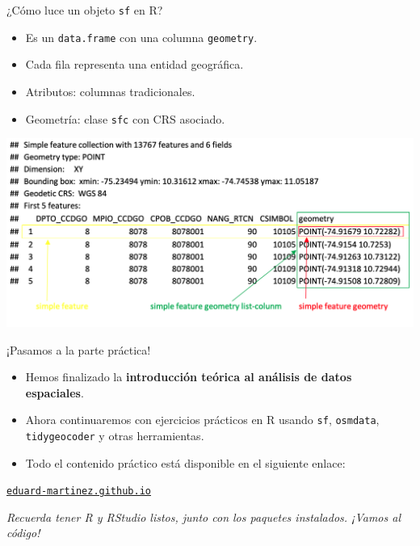 \documentclass{beamer}
\begin{document}
\begin{frame}{¿Cómo luce un objeto \texttt{sf} en R?}
\begin{itemize}
    \item Es un \texttt{data.frame} con una columna \texttt{geometry}.
    \item Cada fila representa una entidad geográfica.
    \item Atributos: columnas tradicionales.
    \item Geometría: clase \texttt{sfc} con CRS asociado.
\end{itemize}
\centering
\includegraphics[width=0.95\linewidth]{figures/sf_console.png}
\end{frame}

\begin{frame}{¡Pasamos a la parte práctica!}
\vspace{1em}
\begin{itemize}
    \item Hemos finalizado la \textbf{introducción teórica al análisis de datos espaciales}.
    \item Ahora continuaremos con ejercicios prácticos en R usando \texttt{sf}, \texttt{osmdata}, \texttt{tidygeocoder} y otras herramientas.
    \item Todo el contenido práctico está disponible en el siguiente enlace:
\end{itemize}
\vspace{1.5em}
\begin{center}
\Large
\href{https://eduard-martinez.github.io/workshop/gis_in_r/lecture/parte-2.html}{\texttt{eduard-martinez.github.io}}
\end{center}
\vspace{1em}
\small
\textit{Recuerda tener R y RStudio listos, junto con los paquetes instalados. ¡Vamos al código!}
\end{frame}
\end{document}

